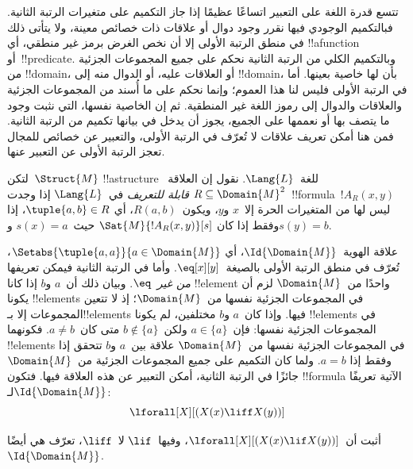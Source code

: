 \documentclass[../../../include/open-logic-section]{subfiles}
\begin{document}

\begin{explain}
تتسع قدرة اللغة على التعبير اتساعًا عظيمًا إذا جاز التكميم على متغيرات
الرتبة الثانية. فبالتكميم الوجودي فيها نقرر وجود دوال أو علاقات ذات
خصائص معينة، ولا يتأتى ذلك في منطق الرتبة الأولى إلا أن نخص الغرض
برمز غير منطقي، أي !!a{function} أو~!!{predicate}.
وبالتكميم الكلي من الرتبة الثانية نحكم على جميع المجموعات الجزئية من
!!{domain}، أو العلاقات عليه، أو الدوال منه إلى !!{domain}،
بأن لها خاصية بعينها. أما في الرتبة الأولى فليس لنا هذا العموم؛
وإنما نحكم على ما أُسند من المجموعات الجزئية والعلاقات والدوال إلى
رموز اللغة غير المنطقية. ثم إن الخاصية نفسها، التي نثبت وجود ما
يتصف بها أو نعممها على الجميع، يجوز أن يدخل في بيانها تكميم من
الرتبة الثانية. فمن هنا أمكن تعريف علاقات لا تُعرّف في الرتبة الأولى،
والتعبير عن خصائص للمجال تعجز الرتبة الأولى عن التعبير عنها.
\end{explain}

\begin{defn}
لتكن~$\Struct{M}$ !!a{structure} للغة~$\Lang{L}$.
نقول إن العلاقة~$R \subseteq \Domain{M}^2$ \emph{قابلة للتعريف}
في~$\Lang{L}$ إذا وجدت~!!{formula}~$!A_R(x, y)$ ليس لها من
المتغيرات الحرة إلا~$x$ و$y$، ويكون~$R(a, b)$، أي
$\tuple{a,b} \in R$، إذا وفقط إذا كان
$\Sat{M}{!A_R(x, y)}[s]$ حيث~$s(x) = a$ و$s(y) = b$.
\end{defn}

\begin{ex}
علاقة الهوية~$\Id{\Domain{M}}$، أي
$\Setabs{\tuple{a,a}}{a \in \Domain{M}}$، تُعرّف في منطق
الرتبة الأولى بالصيغة~$\eq[x][y]$. وأما في الرتبة الثانية فيمكن
تعريفها \emph{من غير~$\eq$}. وبيان ذلك أن~$a$ و$b$ إذا كانا
!!{element} واحدًا من~$\Domain{M}$ لزم أن يكونا !!{element}s
في المجموعات الجزئية نفسها من~$\Domain{M}$؛ إذ لا تتعين المجموعات
إلا بـ!!{element}s فيها. وإذا كان~$a$ و$b$ مختلفين، لم يكونا
!!{element}s في المجموعات الجزئية نفسها: فإن~$a \in \{a\}$
ولكن~$b \notin \{a\}$ متى كان~$a \neq b$.
فكونهما !!{element}s في المجموعات الجزئية نفسها
من~$\Domain{M}$ علاقة بين~$a$ و$b$ تتحقق إذا وفقط إذا
$a = b$. ولما كان التكميم على جميع المجموعات الجزئية
من~$\Domain{M}$ جائزًا في الرتبة الثانية، أمكن التعبير عن هذه
العلاقة فيها. فتكون !!{formula} الآتية تعريفًا
لـ$\Id{\Domain{M}}$:
\[
\lforall[X][(X(x) \liff X(y))]
\]
\end{ex}

\begin{prob}
أثبت أن~$\lforall[X][(X(x) \lif X(y))]$، وفيها~$\lif$
لا~$\liff$، تعرّف هي أيضًا~$\Id{\Domain{M}}$.
\end{prob}
\end{document}
